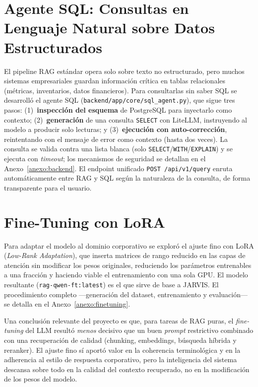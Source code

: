 \section{Agente SQL: Consultas en Lenguaje Natural sobre Datos Estructurados}
\label{sec:sql-agent}

El pipeline RAG estándar opera solo sobre texto no estructurado, pero muchos sistemas empresariales guardan información crítica en tablas relacionales (métricas, inventarios, datos financieros). Para consultarlas sin saber SQL se desarrolló el agente SQL (\texttt{backend/app/core/sql\_agent.py}), que sigue tres pasos: (1)~\textbf{inspección del esquema} de PostgreSQL para inyectarlo como contexto; (2)~\textbf{generación} de una consulta \texttt{SELECT} con LiteLLM, instruyendo al modelo a producir solo lecturas; y (3)~\textbf{ejecución con auto-corrección}, reintentando con el mensaje de error como contexto (hasta dos veces). La consulta se valida contra una lista blanca (solo \texttt{SELECT}/\texttt{WITH}/\texttt{EXPLAIN}) y se ejecuta con \textit{timeout}; los mecanismos de seguridad se detallan en el Anexo~\ref{anexo:backend}. El endpoint unificado \texttt{POST /api/v1/query} enruta automáticamente entre RAG y SQL según la naturaleza de la consulta, de forma transparente para el usuario.

\section{Fine-Tuning con LoRA}
\label{sec:finetuning-impl}

Para adaptar el modelo al dominio corporativo se exploró el ajuste fino con LoRA (\textit{Low-Rank Adaptation}), que inserta matrices de rango reducido en las capas de atención sin modificar los pesos originales, reduciendo los parámetros entrenables a una fracción y haciendo viable el entrenamiento con una sola GPU. El modelo resultante (\texttt{rag-qwen-ft:latest}) es el que sirve de base a JARVIS. El procedimiento completo ---generación del dataset, entrenamiento y evaluación--- se detalla en el Anexo~\ref{anexo:finetuning}.

Una conclusión relevante del proyecto es que, para tareas de RAG puras, el \textit{fine-tuning} del LLM resultó \textit{menos} decisivo que un buen \textit{prompt} restrictivo combinado con una recuperación de calidad (chunking, embeddings, búsqueda híbrida y reranker). El ajuste fino sí aportó valor en la coherencia terminológica y en la adherencia al estilo de respuesta corporativo, pero la inteligencia del sistema descansa sobre todo en la calidad del contexto recuperado, no en la modificación de los pesos del modelo.

